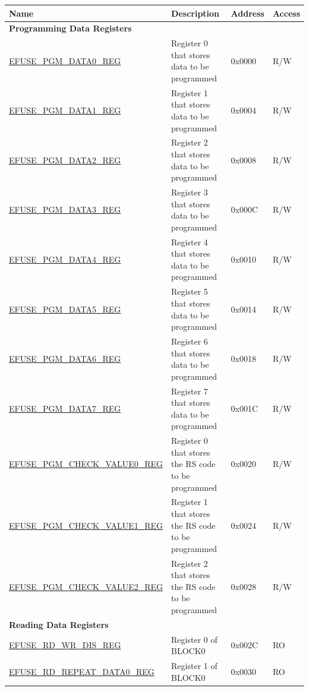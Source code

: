 \begin{longtable}{ | p{5.8cm} | p{7cm} | p{1.3cm} | p{1.2cm} | }
\hline\rowcolor{lightgray}
Name & Description &  Address & Access \\ \hline
\endhead
\multicolumn{4}{|l|}{\textbf{Programming Data Registers}} \\ \hline
\hyperref[regdesc:EFUSEPGMDATA0REG]{EFUSE\_PGM\_DATA0\_REG} & Register 0 that stores data to be programmed & 0x0000 & R/W \\ \hline
\hyperref[regdesc:EFUSEPGMDATA1REG]{EFUSE\_PGM\_DATA1\_REG} & Register 1 that stores data to be programmed & 0x0004 & R/W \\ \hline
\hyperref[regdesc:EFUSEPGMDATA2REG]{EFUSE\_PGM\_DATA2\_REG} & Register 2 that stores data to be programmed & 0x0008 & R/W \\ \hline
\hyperref[regdesc:EFUSEPGMDATA3REG]{EFUSE\_PGM\_DATA3\_REG} & Register 3 that stores data to be programmed & 0x000C & R/W \\ \hline
\hyperref[regdesc:EFUSEPGMDATA4REG]{EFUSE\_PGM\_DATA4\_REG} & Register 4 that stores data to be programmed & 0x0010 & R/W \\ \hline
\hyperref[regdesc:EFUSEPGMDATA5REG]{EFUSE\_PGM\_DATA5\_REG} & Register 5 that stores data to be programmed & 0x0014 & R/W \\ \hline
\hyperref[regdesc:EFUSEPGMDATA6REG]{EFUSE\_PGM\_DATA6\_REG} & Register 6 that stores data to be programmed & 0x0018 & R/W \\ \hline
\hyperref[regdesc:EFUSEPGMDATA7REG]{EFUSE\_PGM\_DATA7\_REG} & Register 7 that stores data to be programmed & 0x001C & R/W \\ \hline
\hyperref[regdesc:EFUSEPGMCHECKVALUE0REG]{EFUSE\_PGM\_CHECK\_VALUE0\_REG} & Register 0 that stores the RS code to be programmed & 0x0020 & R/W \\ \hline
\hyperref[regdesc:EFUSEPGMCHECKVALUE1REG]{EFUSE\_PGM\_CHECK\_VALUE1\_REG} & Register 1 that stores the RS code to be programmed & 0x0024 & R/W \\ \hline
\hyperref[regdesc:EFUSEPGMCHECKVALUE2REG]{EFUSE\_PGM\_CHECK\_VALUE2\_REG} & Register 2 that stores the RS code to be programmed & 0x0028 & R/W \\ \hline
\multicolumn{4}{|l|}{\textbf{Reading Data Registers}} \\ \hline
\hyperref[regdesc:EFUSERDWRDISREG]{EFUSE\_RD\_WR\_DIS\_REG} & Register 0 of BLOCK0 & 0x002C & RO \\ \hline
\hyperref[regdesc:EFUSERDREPEATDATA0REG]{EFUSE\_RD\_REPEAT\_DATA0\_REG} & Register 1 of BLOCK0 & 0x0030 & RO \\ \hline

\end{longtable}
